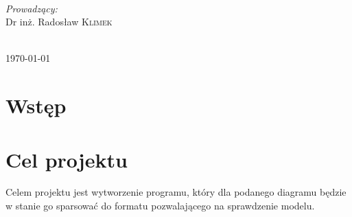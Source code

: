 \documentclass[a4paper, 11pt]{article}
\begin{document}
\begin{titlepage}
\begin{minipage}{0.4\textwidth}
\begin{flushleft}
\end{flushleft}
\end{minipage}
~
\begin{minipage}{0.4\textwidth}
\begin{flushright} \large
\emph{Prowadzący:}\\
 Dr inż. Radosław \textsc{Klimek}  %
\end{flushright}
\end{minipage} \\[5cm]
		
		
		
		{\large \today}\\[3cm] %
		
		
		
		
		\vfill %
		
	\end{titlepage}
	
	
	\tableofcontents
	\vfill
	\newpage
	
	
	
	
	\section{Wstęp}
	
	\indent
	\section{Cel projektu}
	Celem projektu jest wytworzenie programu, który dla podanego diagramu będzie w stanie go sparsować do formatu pozwalającego na sprawdzenie modelu.
	
\end{document}
